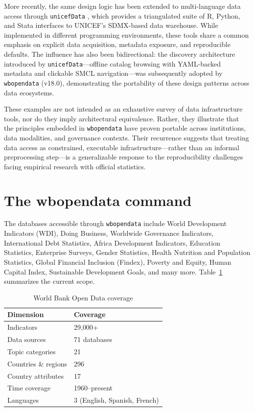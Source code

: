 \documentclass[bib]{statapress}
\begin{document}
More recently, the same design logic has been extended to multi-language data
access through \texttt{unicefData} \citep{unicefdata2026}, which provides a triangulated suite of R, Python,
and Stata interfaces to UNICEF's SDMX-based data warehouse. While implemented in
different programming environments, these tools share a common emphasis on
explicit data acquisition, metadata exposure, and reproducible defaults.
The influence has also been bidirectional: the discovery architecture introduced
by \texttt{unicefData}---offline catalog browsing with YAML-backed metadata and
clickable SMCL navigation---was subsequently adopted by \texttt{wbopendata}
(v18.0), demonstrating the portability of these design patterns across data
ecosystems.

These examples are not intended as an exhaustive survey of data infrastructure
tools, nor do they imply architectural equivalence. Rather, they illustrate that the
principles embedded in \texttt{wbopendata} have proven portable across institutions,
data modalities, and governance contexts. Their recurrence suggests that treating
data access as constrained, executable infrastructure—rather than an informal
preprocessing step—is a generalizable response to the reproducibility challenges
facing empirical research with official statistics.

\section{The wbopendata command}\label{sec:command}

The databases accessible through \texttt{wbopendata} include World Development Indicators (WDI), Doing Business, Worldwide Governance Indicators, International Debt Statistics, Africa Development Indicators, Education Statistics, Enterprise Surveys, Gender Statistics, Health Nutrition and Population Statistics, Global Financial Inclusion (Findex), Poverty and Equity, Human Capital Index, Sustainable Development Goals, and many more. Table~\ref{tab:coverage} summarizes the current scope.

\begin{table}[H]
\centering
\caption{World Bank Open Data coverage}
\label{tab:coverage}
\begin{tabular}{ll}
\hline
Dimension & Coverage \\
\hline
Indicators & 29{,}000+ \\
Data sources & 71 databases \\
Topic categories & 21 \\
Countries \& regions & 296 \\
Country attributes & 17 \\
Time coverage & 1960--present \\
Languages & 3 (English, Spanish, French) \\
\hline
\end{tabular}
\end{table}
\end{document}

